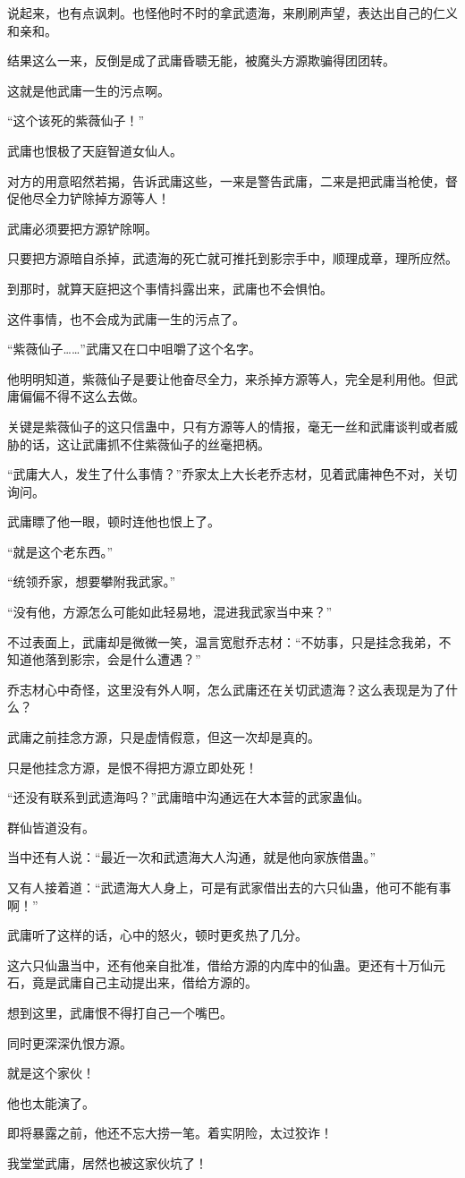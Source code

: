 \begin{this_body}
说起来，也有点讽刺。也怪他时不时的拿武遗海，来刷刷声望，表达出自己的仁义和亲和。

结果这么一来，反倒是成了武庸昏聩无能，被魔头方源欺骗得团团转。

这就是他武庸一生的污点啊。

“这个该死的紫薇仙子！”

武庸也恨极了天庭智道女仙人。

对方的用意昭然若揭，告诉武庸这些，一来是警告武庸，二来是把武庸当枪使，督促他尽全力铲除掉方源等人！

武庸必须要把方源铲除啊。

只要把方源暗自杀掉，武遗海的死亡就可推托到影宗手中，顺理成章，理所应然。

到那时，就算天庭把这个事情抖露出来，武庸也不会惧怕。

这件事情，也不会成为武庸一生的污点了。

“紫薇仙子……”武庸又在口中咀嚼了这个名字。

他明明知道，紫薇仙子是要让他奋尽全力，来杀掉方源等人，完全是利用他。但武庸偏偏不得不这么去做。

关键是紫薇仙子的这只信蛊中，只有方源等人的情报，毫无一丝和武庸谈判或者威胁的话，这让武庸抓不住紫薇仙子的丝毫把柄。

“武庸大人，发生了什么事情？”乔家太上大长老乔志材，见着武庸神色不对，关切询问。

武庸瞟了他一眼，顿时连他也恨上了。

“就是这个老东西。”

“统领乔家，想要攀附我武家。”

“没有他，方源怎么可能如此轻易地，混进我武家当中来？”

不过表面上，武庸却是微微一笑，温言宽慰乔志材：“不妨事，只是挂念我弟，不知道他落到影宗，会是什么遭遇？”

乔志材心中奇怪，这里没有外人啊，怎么武庸还在关切武遗海？这么表现是为了什么？

武庸之前挂念方源，只是虚情假意，但这一次却是真的。

只是他挂念方源，是恨不得把方源立即处死！

“还没有联系到武遗海吗？”武庸暗中沟通远在大本营的武家蛊仙。

群仙皆道没有。

当中还有人说：“最近一次和武遗海大人沟通，就是他向家族借蛊。”

又有人接着道：“武遗海大人身上，可是有武家借出去的六只仙蛊，他可不能有事啊！”

武庸听了这样的话，心中的怒火，顿时更炙热了几分。

这六只仙蛊当中，还有他亲自批准，借给方源的内库中的仙蛊。更还有十万仙元石，竟是武庸自己主动提出来，借给方源的。

想到这里，武庸恨不得打自己一个嘴巴。

同时更深深仇恨方源。

就是这个家伙！

他也太能演了。

即将暴露之前，他还不忘大捞一笔。着实阴险，太过狡诈！

我堂堂武庸，居然也被这家伙坑了！

\end{this_body}

